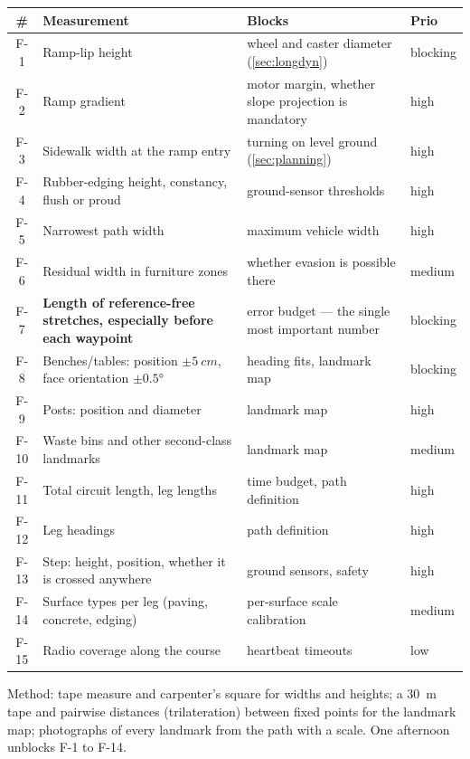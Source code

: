 \documentclass[11pt,a4paper]{article}
\newcommand{\tw}[1]{{\small\textcolor{warn}{\textsf{#1}}}}
\newcommand{\tk}[1]{{\small\textcolor{cold}{\textsf{#1}}}}
\newcommand{\tb}[1]{{\small\textcolor{bad}{\textsf{#1}}}}
\begin{document}
\begin{center}
\small
\begin{tabularx}{\textwidth}{@{}cP{62mm}Ll@{}}
\toprule
\# & \textbf{Measurement} & \textbf{Blocks} & \textbf{Prio}\\
\midrule
F-1 & Ramp-lip height & wheel and caster diameter (\cref{sec:longdyn}) & \tb{blocking}\\
F-2 & Ramp gradient & motor margin, whether slope projection is mandatory & \tw{high}\\
F-3 & Sidewalk width at the ramp entry & turning on level ground (\cref{sec:planning}) & \tw{high}\\
F-4 & Rubber-edging height, constancy, flush or proud & ground-sensor thresholds & \tw{high}\\
F-5 & Narrowest path width & maximum vehicle width & \tw{high}\\
F-6 & Residual width in furniture zones & whether evasion is possible there & \tk{medium}\\
F-7 & \textbf{Length of reference-free stretches, especially before each waypoint} & error budget --- the single most important number & \tb{blocking}\\
F-8 & Benches/tables: position $\pm\qty{5}{cm}$, face orientation $\pm\ang{0.5}$ & heading fits, landmark map & \tb{blocking}\\
F-9 & Posts: position and diameter & landmark map & \tw{high}\\
F-10 & Waste bins and other second-class landmarks & landmark map & \tk{medium}\\
F-11 & Total circuit length, leg lengths & time budget, path definition & \tw{high}\\
F-12 & Leg headings & path definition & \tw{high}\\
F-13 & Step: height, position, whether it is crossed anywhere & ground sensors, safety & \tw{high}\\
F-14 & Surface types per leg (paving, concrete, edging) & per-surface scale calibration & \tk{medium}\\
F-15 & Radio coverage along the course & heartbeat timeouts & low\\
\bottomrule
\end{tabularx}
\end{center}

Method: tape measure and carpenter's square for widths and heights; a
\qty{30}{m} tape and pairwise distances (trilateration) between fixed points for
the landmark map; photographs of every landmark from the path with a scale.
One afternoon unblocks F-1 to F-14.
\end{document}
